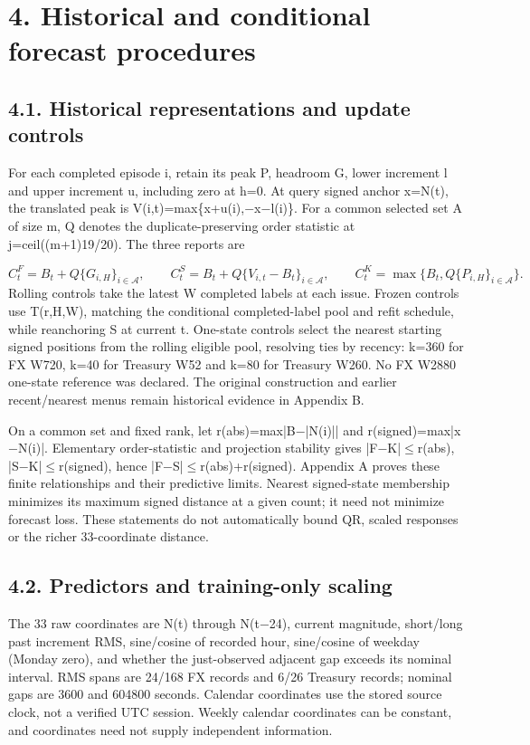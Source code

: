 \documentclass[10pt,a4paper]{article}
\begin{document}
\section*{4. Historical and conditional forecast procedures}
\subsection*{4.1. Historical representations and update controls}
For each completed episode i, retain its peak P, headroom G, lower increment l and upper increment u, including zero at h=0. At query signed anchor x=N(t), the translated peak is V(i,t)=max\{x+u(i),\(-\)x\(-\)l(i)\}. For a common selected set A of size m, Q denotes the duplicate-preserving order statistic at j=ceil((m+1)19/20). The three reports are

\[
C^F_t=B_t+Q\{G_{i,H}\}_{i\in\mathcal A},\qquad C^S_t=B_t+Q\{V_{i,t}-B_t\}_{i\in\mathcal A},\qquad C^K_t=\max\{B_t,Q\{P_{i,H}\}_{i\in\mathcal A}\}.
\]
Rolling controls take the latest W completed labels at each issue. Frozen controls use T(r,H,W), matching the conditional completed-label pool and refit schedule, while reanchoring S at current t. One-state controls select the nearest starting signed positions from the rolling eligible pool, resolving ties by recency: k=360 for FX W720, k=40 for Treasury W52 and k=80 for Treasury W260. No FX W2880 one-state reference was declared. The original construction and earlier recent/nearest menus remain historical evidence in Appendix B.

On a common set and fixed rank, let r(abs)=max|B\(-\)|N(i)|| and r(signed)=max|x\(-\)N(i)|. Elementary order-statistic and projection stability gives |F\(-\)K|\(\le\)r(abs), |S\(-\)K|\(\le\)r(signed), hence |F\(-\)S|\(\le\)r(abs)+r(signed). Appendix A proves these finite relationships and their predictive limits. Nearest signed-state membership minimizes its maximum signed distance at a given count; it need not minimize forecast loss. These statements do not automatically bound QR, scaled responses or the richer 33-coordinate distance.

\subsection*{4.2. Predictors and training-only scaling}
The 33 raw coordinates are N(t) through N(t\(-\)24), current magnitude, short/long past increment RMS, sine/cosine of recorded hour, sine/cosine of weekday (Monday zero), and whether the just-observed adjacent gap exceeds its nominal interval. RMS spans are 24/168 FX records and 6/26 Treasury records; nominal gaps are 3600 and 604800 seconds. Calendar coordinates use the stored source clock, not a verified UTC session. Weekly calendar coordinates can be constant, and coordinates need not supply independent information.
\end{document}
